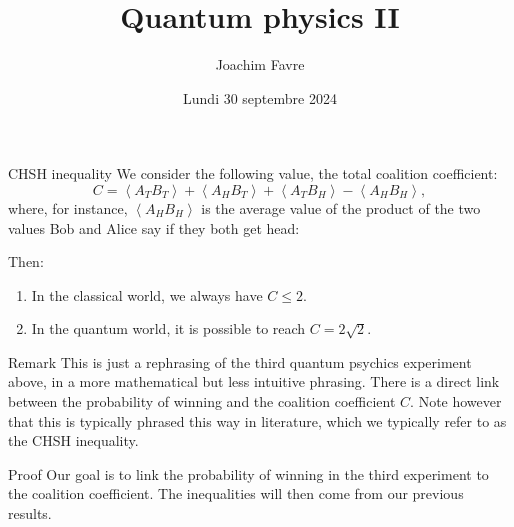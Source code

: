 \documentclass[a4paper]{article}
\title{Quantum physics II}
\author{Joachim Favre}
\date{Lundi 30 septembre 2024}
\begin{document}
\maketitle


\begin{parag}{CHSH inequality}
    We consider the following value, the total coalition coefficient: 
    \[C = \left\langle A_T B_T \right\rangle + \left\langle A_H B_T \right\rangle + \left\langle A_T B_H \right\rangle - \left\langle A_H B_H \right\rangle,\]
    where, for instance, $\left\langle A_H B_H \right\rangle$ is the average value of the product of the two values Bob and Alice say if they both get head: 

    Then:
    \begin{enumerate}
        \item In the classical world, we always have $C \leq 2$.
        \item In the quantum world, it is possible to reach $C = 2\sqrt{2}$.
    \end{enumerate}
    
    \begin{subparag}{Remark}
        This is just a rephrasing of the third quantum psychics experiment above, in a more mathematical but less intuitive phrasing. There is a direct link between the probability of winning and the coalition coefficient $C$. Note however that this is typically phrased this way in literature, which we typically refer to as the CHSH inequality.
    \end{subparag}

    \begin{subparag}{Proof}
        Our goal is to link the probability of winning in the third experiment to the coalition coefficient. The inequalities will then come from our previous results.


\end{subparag}
\end{parag}
\end{document}
